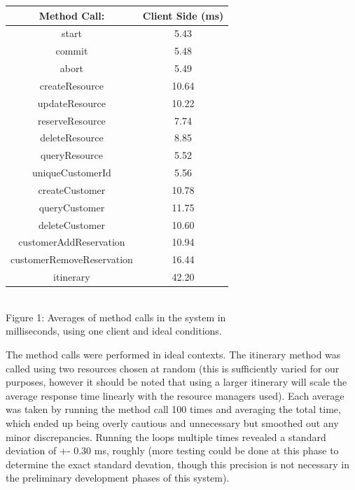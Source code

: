 \documentclass[letterpaper,12pt]{article}
\begin{document}
\begin{center}
	\begin{tabular}{ |c|c| } 
		\hline
		Method Call: & Client Side (ms) \\
		\hline
		start & 5.43  \\ 
		commit & 5.48  \\ 
		abort & 5.49  \\ 
		createResource & 10.64  \\ 
		updateResource & 10.22  \\ 
		reserveResource & 7.74  \\ 
		deleteResource & 8.85  \\ 
		queryResource & 5.52  \\ 
		uniqueCustomerId & 5.56  \\ 
		createCustomer & 10.78 \\
		queryCustomer & 11.75 \\ 
		deleteCustomer & 10.60 \\ 
		customerAddReservation & 10.94 \\ 
		customerRemoveReservation & 16.44 \\
		itinerary & 42.20\\
		\hline
	\end{tabular}\\
	Figure 1: Averages of method calls in the system in \\milliseconds, using one client and ideal conditions.
\end{center}
The method calls were performed in ideal contexts. The itinerary method was called using two resources chosen at random (this is sufficiently varied for our purposes, however it should be noted that using a larger itinerary will scale the average response time linearly with the resource managers used). Each average was taken by running the method call 100 times and averaging the total time, which ended up being overly cautious and unnecessary but smoothed out any minor discrepancies. Running the loops multiple times revealed a standard deviation of +- 0.30 ms, roughly (more testing could be done at this phase to determine the exact standard devation, though this precision is not necessary in the preliminary development phases of this system).
\end{document}
